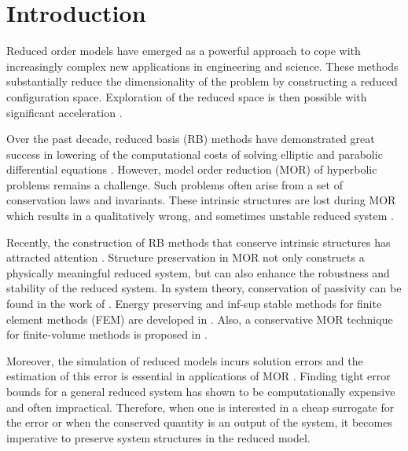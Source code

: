 \section{Introduction}
\label{sec:intro}

Reduced order models have emerged as a powerful approach to cope with increasingly complex new applications in engineering and science. These methods substantially reduce the dimensionality of the problem by constructing a reduced configuration space. Exploration of the reduced space is then possible with significant acceleration \cite{hesthaven2015certified,Haasdonk2017}.

Over the past decade, reduced basis (RB) methods have demonstrated great success in lowering of the computational costs of solving elliptic and parabolic differential equations \cite{ito1998reduced,ito2001reduced}. However, model order reduction (MOR) of hyperbolic problems remains a challenge. Such problems often arise from a set of conservation laws and invariants. These intrinsic structures are lost during MOR which results in a qualitatively wrong, and sometimes unstable reduced system \cite{Amsallem:2014ef}.


Recently, the construction of RB methods that conserve intrinsic structures has attracted attention \cite{doi:10.1137/17M1111991,1705.00498,kalashnikova2014stabilization,farhat2015structure,doi:10.1137/110836742,doi:10.1137/140959602,beattie2011structure,doi:10.1137/140978922}. Structure preservation in MOR not only constructs a physically meaningful reduced system, but can also enhance the robustness and stability of the reduced system. In system theory, conservation of passivity can be found in the work of \cite{polyuga2010structure,gugercin2012structure}. Energy preserving and inf-sup stable methods for finite element methods (FEM) are developed in \cite{farhat2015structure,ballarin2015supremizer}. Also, a conservative MOR technique for finite-volume methods is proposed in \cite{1711.11550}.

Moreover, the simulation of reduced models incurs solution errors and the estimation of this error is essential in applications of MOR \cite{HaasdonkOhlberger11,RuinerEtAl12,BhattEtAl18}. Finding tight error bounds for a general reduced system has shown to be computationally expensive and often impractical. Therefore, when one is interested in a cheap surrogate for the error or when the conserved quantity is an output of the system, it becomes imperative to preserve system structures in the reduced model.

